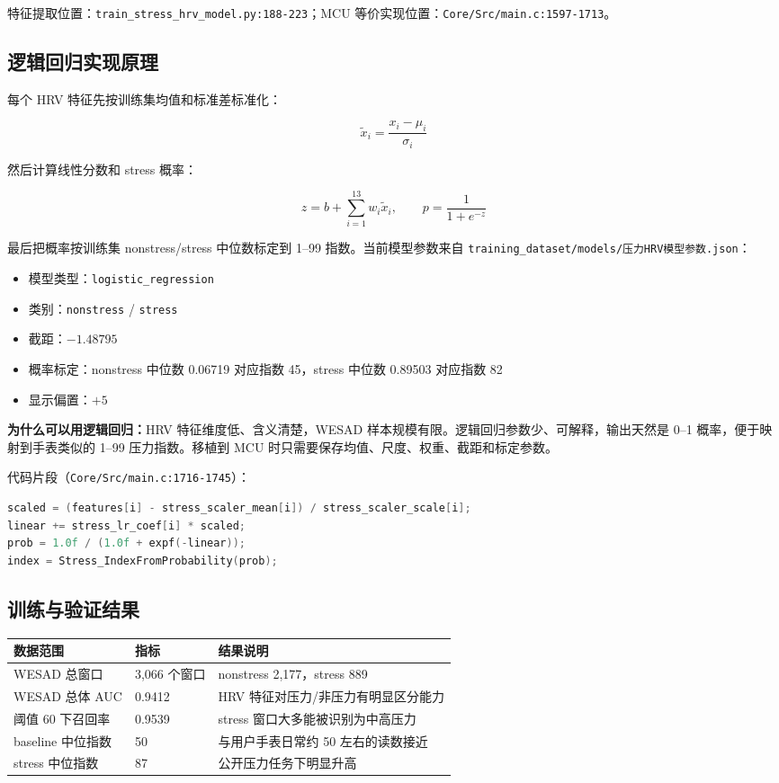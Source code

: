 \documentclass[10.5pt,a4paper,UTF8]{ctexart}
\newcommand{\keybox}[2]{
  \vspace{0.4em}
  \noindent
  \colorbox{#1}{%
    \parbox{\dimexpr\linewidth-2\fboxsep\relax}{#2}%
  }
  \vspace{0.4em}
}
\begin{document}
特征提取位置：\texttt{train\_stress\_hrv\_model.py:188-223}；MCU 等价实现位置：\texttt{Core/Src/main.c:1597-1713}。

\subsection{逻辑回归实现原理}

每个 HRV 特征先按训练集均值和标准差标准化：

\[
\tilde{x}_i=\frac{x_i-\mu_i}{\sigma_i}
\]

然后计算线性分数和 stress 概率：

\[
z=b+\sum_{i=1}^{13}w_i\tilde{x}_i,\qquad
p=\frac{1}{1+e^{-z}}
\]

最后把概率按训练集 nonstress/stress 中位数标定到 1--99 指数。当前模型参数来自 \texttt{training\_dataset/models/压力HRV模型参数.json}：

\begin{itemize}
  \item 模型类型：\texttt{logistic\_regression}
  \item 类别：\texttt{nonstress} / \texttt{stress}
  \item 截距：\(-1.48795\)
  \item 概率标定：nonstress 中位数 0.06719 对应指数 45，stress 中位数 0.89503 对应指数 82
  \item 显示偏置：\(+5\)
\end{itemize}

\keybox{softgreen}{
\textbf{为什么可以用逻辑回归：}HRV 特征维度低、含义清楚，WESAD 样本规模有限。逻辑回归参数少、可解释，输出天然是 0--1 概率，便于映射到手表类似的 1--99 压力指数。移植到 MCU 时只需要保存均值、尺度、权重、截距和标定参数。
}

代码片段（\texttt{Core/Src/main.c:1716-1745}）：

\begin{lstlisting}[language=C]
scaled = (features[i] - stress_scaler_mean[i]) / stress_scaler_scale[i];
linear += stress_lr_coef[i] * scaled;
prob = 1.0f / (1.0f + expf(-linear));
index = Stress_IndexFromProbability(prob);
\end{lstlisting}

\subsection{训练与验证结果}

\begin{longtable}{@{}L{4.7cm}L{3.7cm}L{5.2cm}@{}}
\toprule
数据范围 & 指标 & 结果说明 \\
\midrule
WESAD 总窗口 & 3,066 个窗口 & nonstress 2,177，stress 889 \\
WESAD 总体 AUC & 0.9412 & HRV 特征对压力/非压力有明显区分能力 \\
阈值 60 下召回率 & 0.9539 & stress 窗口大多能被识别为中高压力 \\
baseline 中位指数 & 50 & 与用户手表日常约 50 左右的读数接近 \\
stress 中位指数 & 87 & 公开压力任务下明显升高 \\
\bottomrule
\end{longtable}
\end{document}
